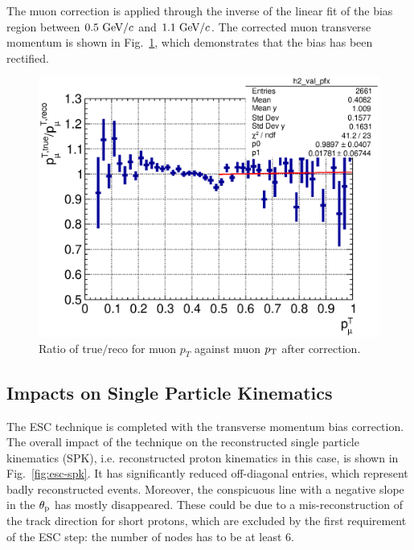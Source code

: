      The muon correction is applied through the inverse of the linear fit of the bias region between $0.5~\textrm{GeV}/c$ and $1.1~\textrm{GeV}/c$.
     The corrected muon transverse momentum is shown in Fig.~\ref{fig:esc-cormupt}, which demonstrates that the bias has been rectified.

     \begin{figure}[h]
     \centering
     \includegraphics[width=\sgfidwid\textwidth]{figures/sel/mu_pt_vs_cor_mu_pt_bias_hist2d_al14.eps} 
     \caption{Ratio of true$/$reco for muon $p_T$ against muon $p_\textrm{T}$ after correction.}
     \label{fig:esc-cormupt}
     \end{figure}

    \subsection{Impacts on Single Particle Kinematics}
     The ESC technique is completed with the transverse momentum bias correction.
     The overall impact of the technique on the reconstructed single particle kinematics (SPK), i.e. reconstructed proton kinematics in this case, is shown in Fig.~\ref{fig:esc-spk}.
     It has significantly reduced off-diagonal entries, which represent badly reconstructed events.
     Moreover, the conspicuous line with a negative slope in the $\theta_\textrm{p}$ has mostly disappeared.
     These could be due to a mis-reconstruction of the track direction for short protons, which are excluded by the first requirement of the ESC step: the number of nodes has to be at least $6$.
     
